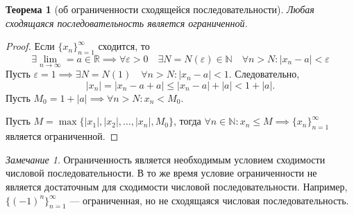 \documentclass[a4paper,12pt]{article} %
\newtheorem{theorem}{Теорема}[subsection]
\theoremstyle{remark}
\newtheorem*{remark}{Замечание}
\begin{document}
\begin{theorem}[об ограниченности сходящейся последовательности]
	Любая сходящаяся последовательность является ограниченной.	
\end{theorem}
\begin{proof}
	Если $\{x_n\}_{n=1}^{\infty}$ сходится, то 
	\[
	\exists \lim_{n \to \infty} = a\in \mathbb{R} \implies \forall \varepsilon>0 \quad \exists N=N(\varepsilon)\in \mathbb{N} \quad \forall n>N : |x_{n}-a|<\varepsilon
	\]
	Пусть $\varepsilon = 1 \implies \exists N=N(1) \quad \forall n>N : |x_{n}-a| < 1$. Следовательно,
	\[
	|x_{n}| = |x_{n}-a+a| \le |x_{n}-a|+|a| < 1+|a|
	.\] 
	Пусть $M_0=1+|a| \implies \forall n>N : x_{n} < M_0$. 
	
	\noindent Пусть $M=\max\{|x_1|, |x_2|, \ldots, |x_{n}|, M_0\}$, тогда $\forall n\in \mathbb{N} : x_{n}\le M\implies \{x_n\}_{n=1}^{\infty}$ является ограниченной.
\end{proof}

\begin{remark}
	Ограниченность является необходимым условием сходимости числовой последовательности. В то же время условие ограниченности не является достаточным для сходимости числовой последовательности.
	Например, $\{(-1)^n\}_{n=1}^{\infty}$ --- ограниченная, но не сходящаяся числовая последовательность.
\end{remark}
\end{document}
